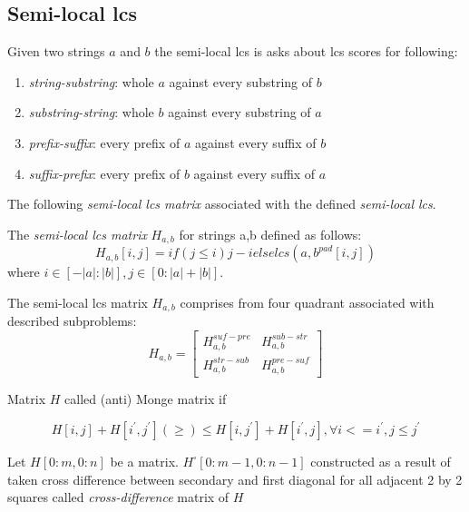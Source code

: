 \subsection{Semi-local lcs}

Given two strings $a$ and $b$ the semi-local lcs is asks about
lcs scores for following:
\begin{enumerate}
\item \emph{string-substring}: whole $a$ against every substring of $b$
\item \emph{substring-string}: whole $b$ against every substring of $a$
\item \emph{prefix-suffix}: every prefix of $a$ against every suffix of $b$
\item \emph{suffix-prefix}: every prefix of $b$ against every suffix of $a$
\end{enumerate} 


The following \emph{semi-local lcs matrix} associated with the defined \emph{semi-local lcs}.
\begin{definition}
The \emph{semi-local lcs matrix}  $H_{a,b}$ for strings a,b defined as follows:
\begin{equation}
	H_{a,b}[i,j] = if (j\leq i) j-i  else lcs(a,b^{pad}[i,j]) 
\end{equation} 
where $i \in [-|a|:|b|], j \in [0:|a|+|b|] $.
\end{definition}
The semi-local lcs matrix $H_{a,b}$ comprises from four
quadrant associated with described  subproblems:
\begin{equation}
 H_{a,b} = \begin{bmatrix}
H_{a,b}^{suf-pre} & H_{a,b}^{sub-str} \\
H_{a,b}^{str-sub} & H_{a,b}^{pre-suf} 
\end{bmatrix}    
\end{equation}

\begin{definition}
Matrix $H$ called (anti) Monge matrix if

\begin{displaymath}
H[i,j]+H[i^{'},j^{'}] (\geq)\leq H[i,j^{'}]+H[i^{'},j], \forall i<=i^{'}, j \leq j^{'}
\end{displaymath}
\end{definition}

\begin{definition}
Let $H[0:m,0:n]$  be a matrix.
$H^{\square}[0:m-1,0:n-1]$ constructed as a result of taken cross difference between secondary and first diagonal for all adjacent 2 by 2 squares called \emph{cross-difference} matrix of  $H$
\end{definition}


